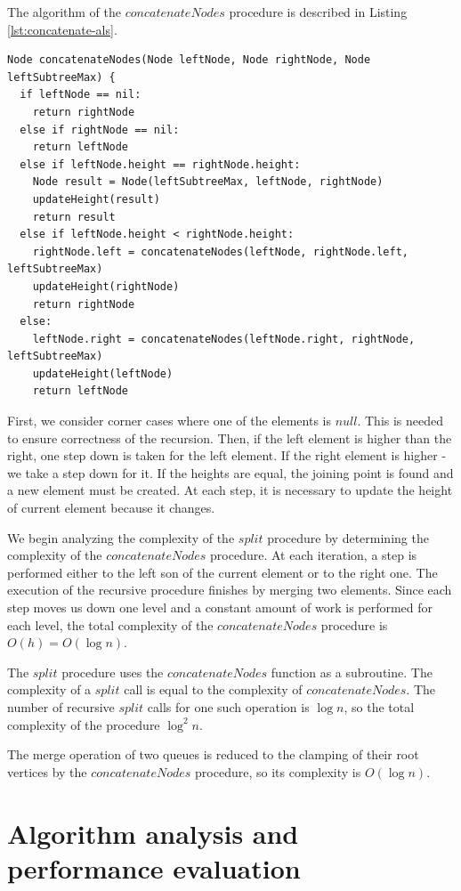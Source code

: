 \documentclass[twoside,twocolumn,10pt]{article}
\begin{document}
	The algorithm of the $concatenateNodes$ procedure is described in Listing \ref{lst:concatenate-als}.
	
		\begin{lstlisting}[caption={Merging two queues},label={lst:concatenate-als},captionpos=b]
Node concatenateNodes(Node leftNode, Node rightNode, Node leftSubtreeMax) {
  if leftNode == nil:
    return rightNode
  else if rightNode == nil:
    return leftNode
  else if leftNode.height == rightNode.height:
    Node result = Node(leftSubtreeMax, leftNode, rightNode)
    updateHeight(result)
    return result
  else if leftNode.height < rightNode.height:
    rightNode.left = concatenateNodes(leftNode, rightNode.left, leftSubtreeMax)
    updateHeight(rightNode)
    return rightNode
  else:
    leftNode.right = concatenateNodes(leftNode.right, rightNode, leftSubtreeMax)
    updateHeight(leftNode)
    return leftNode
		\end{lstlisting}

	First, we consider corner cases where one of the elements is $null$. This is needed to ensure correctness of the recursion. Then, if the left element is higher than the right, one step down is taken for the left element. If the right element is higher - we take a step down for it. If the heights are equal, the joining point is found and a new element must be created. At each step, it is necessary to update the height of current element because it changes.
	
	We begin analyzing the complexity of the $split$ procedure by determining the complexity of the $concatenateNodes$ procedure. At each iteration, a step is performed either to the left son of the current element or to the right one. The execution of the recursive procedure finishes by merging two elements. Since each step moves us down one level and a constant amount of work is performed for each level, the total complexity of the $concatenateNodes$ procedure is $O(h)=O(\log n)$.
	
	The $split$ procedure uses the $concatenateNodes$ function as a subroutine. The complexity of a $split$ call is equal to the complexity of $concatenateNodes$. The number of recursive $split$ calls for one such operation is $\log n$, so the total complexity of the procedure $\log^2 n$.
	
	The merge operation of two queues is reduced to the clamping of their root vertices by the $concatenateNodes$ procedure, so its complexity is $O(\log n)$.

\section{Algorithm analysis and performance evaluation}
\label{sec:algorithm-analysis-and-performance-evaluation}
\end{document}
